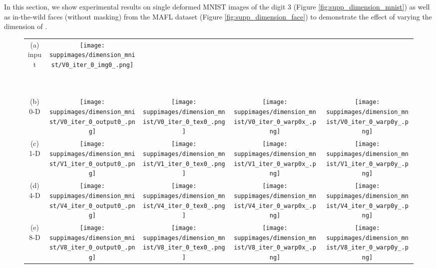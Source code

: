 \documentclass[runningheads]{llncs}
\begin{document}
In this section, we show experimental results on single deformed MNIST images of the digit 3 (Figure \ref{fig:supp_dimension_mnist}) as well as in-the-wild faces (without masking) from the MAFL dataset (Figure \ref{fig:supp_dimension_face}) to demonstrate the effect of varying the dimension of .

\begin{figure}[ht]
	\begin{center}
		\begin{tabular}{c@{\hspace{0.1in}}c@{\hspace{0.1in}}c@{\hspace{0.1in}}c@{\hspace{0.1in}}c}
		(a) input & 
		\texttt{[image: suppimages/dimension\_mnist/V0\_iter\_0\_img0\_.png]} & & &  \\~\\~\\
		
		(b) 0-D  &
		\texttt{[image: suppimages/dimension\_mnist/V0\_iter\_0\_output0\_.png]} &
		\texttt{[image: suppimages/dimension\_mnist/V0\_iter\_0\_tex0\_.png]} &
		\texttt{[image: suppimages/dimension\_mnist/V0\_iter\_0\_warp0x\_.png]} &
		\texttt{[image: suppimages/dimension\_mnist/V0\_iter\_0\_warp0y\_.png]} \\
		
		(c) 1-D  &
		\texttt{[image: suppimages/dimension\_mnist/V1\_iter\_0\_output0\_.png]} &
		\texttt{[image: suppimages/dimension\_mnist/V1\_iter\_0\_tex0\_.png]} &
		\texttt{[image: suppimages/dimension\_mnist/V1\_iter\_0\_warp0x\_.png]} &
		\texttt{[image: suppimages/dimension\_mnist/V1\_iter\_0\_warp0y\_.png]} \\
		
		(d) 4-D  &
		\texttt{[image: suppimages/dimension\_mnist/V4\_iter\_0\_output0\_.png]} &
		\texttt{[image: suppimages/dimension\_mnist/V4\_iter\_0\_tex0\_.png]} &
		\texttt{[image: suppimages/dimension\_mnist/V4\_iter\_0\_warp0x\_.png]} &
		\texttt{[image: suppimages/dimension\_mnist/V4\_iter\_0\_warp0y\_.png]} \\
		
		(e) 8-D  &
		\texttt{[image: suppimages/dimension\_mnist/V8\_iter\_0\_output0\_.png]} &
		\texttt{[image: suppimages/dimension\_mnist/V8\_iter\_0\_tex0\_.png]} &
		\texttt{[image: suppimages/dimension\_mnist/V8\_iter\_0\_warp0x\_.png]} &
		\texttt{[image: suppimages/dimension\_mnist/V8\_iter\_0\_warp0y\_.png]} \\
		

\end{tabular}
\end{center}
\end{figure}
\end{document}
